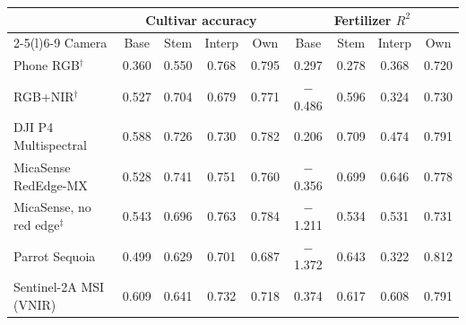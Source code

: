\begin{tabular}{@{}lcccccccc@{}}
\toprule
 & \multicolumn{4}{c}{Cultivar accuracy} & \multicolumn{4}{c}{Fertilizer $R^2$} \\
\cmidrule(lr){2-5}\cmidrule(l){6-9}
Camera & Base & Stem & Interp & Own & Base & Stem & Interp & Own \\
\midrule
Phone RGB$^\dagger$ & 0.360 & 0.550 & 0.768 & 0.795 & 0.297 & 0.278 & 0.368 & 0.720 \\
RGB+NIR$^\dagger$ & 0.527 & 0.704 & 0.679 & 0.771 & $-$0.486 & 0.596 & 0.324 & 0.730 \\
DJI P4 Multispectral & 0.588 & 0.726 & 0.730 & 0.782 & 0.206 & 0.709 & 0.474 & 0.791 \\
MicaSense RedEdge-MX & 0.528 & 0.741 & 0.751 & 0.760 & $-$0.356 & 0.699 & 0.646 & 0.778 \\
MicaSense, no red edge$^\ddagger$ & 0.543 & 0.696 & 0.763 & 0.784 & $-$1.211 & 0.534 & 0.531 & 0.731 \\
Parrot Sequoia & 0.499 & 0.629 & 0.701 & 0.687 & $-$1.372 & 0.643 & 0.322 & 0.812 \\
Sentinel-2A MSI (VNIR) & 0.609 & 0.641 & 0.732 & 0.718 & 0.374 & 0.617 & 0.608 & 0.791 \\
\bottomrule
\end{tabular}
